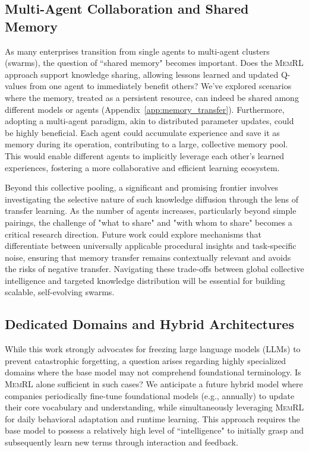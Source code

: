 \documentclass{article}
\theoremstyle{plain}
\theoremstyle{definition}
\theoremstyle{remark}
\begin{document}
\subsection{Multi-Agent Collaboration and Shared Memory}
As many enterprises transition from single agents to multi-agent clusters (swarms), the question of ``shared memory" becomes important. Does the \textsc{MemRL} approach support knowledge sharing, allowing lessons learned and updated Q-values from one agent to immediately benefit others? We've explored scenarios where the memory, treated as a persistent resource, can indeed be shared among different models or agents (Appendix~\ref{app:memory_transfer}). Furthermore, adopting a multi-agent paradigm, akin to distributed parameter updates, could be highly beneficial. Each agent could accumulate experience and save it as memory during its operation, contributing to a large, collective memory pool. This would enable different agents to implicitly leverage each other's learned experiences, fostering a more collaborative and efficient learning ecosystem.

Beyond this collective pooling, a significant and promising frontier involves investigating the selective nature of such knowledge diffusion through the lens of transfer learning. As the number of agents increases, particularly beyond simple pairings, the challenge of "what to share" and "with whom to share" becomes a critical research direction. Future work could explore mechanisms that differentiate between universally applicable procedural insights and task-specific noise, ensuring that memory transfer remains contextually relevant and avoids the risks of negative transfer. Navigating these trade-offs between global collective intelligence and targeted knowledge distribution will be essential for building scalable, self-evolving swarms.
\subsection{Dedicated Domains and Hybrid Architectures}
While this work strongly advocates for freezing large language models (LLMs) to prevent catastrophic forgetting, a question arises regarding highly specialized domains where the base model may not comprehend foundational terminology. Is \textsc{MemRL} alone sufficient in such cases? We anticipate a future hybrid model where companies periodically fine-tune foundational models (e.g., annually) to update their core vocabulary and understanding, while simultaneously leveraging \textsc{MemRL} for daily behavioral adaptation and runtime learning. This approach requires the base model to possess a relatively high level of ``intelligence" to initially grasp and subsequently learn new terms through interaction and feedback.
\end{document}
